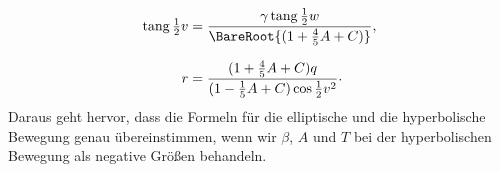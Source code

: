 \[
\begin{aligned}
\operatorname{tang}\tfrac{1}{2}v&=\frac{\gamma\operatorname{tang}\tfrac{1}{2}w}{\BareRoot{(1+\tfrac{4}{5}A+C)}},\\[.7em]
r&=\frac{(1+\tfrac{4}{5}A+C)q}{(1-\tfrac{1}{5}A+C)\cos\tfrac{1}{2}v^2}\mathord{\raisebox{.35ex}{.}}
\end{aligned}
\]
Daraus geht hervor, dass die Formeln für die elliptische und die hyperbolische Bewegung genau übereinstimmen, wenn wir $\beta$, $A$ und $T$ bei der hyperbolischen Bewegung als negative Größen behandeln.
